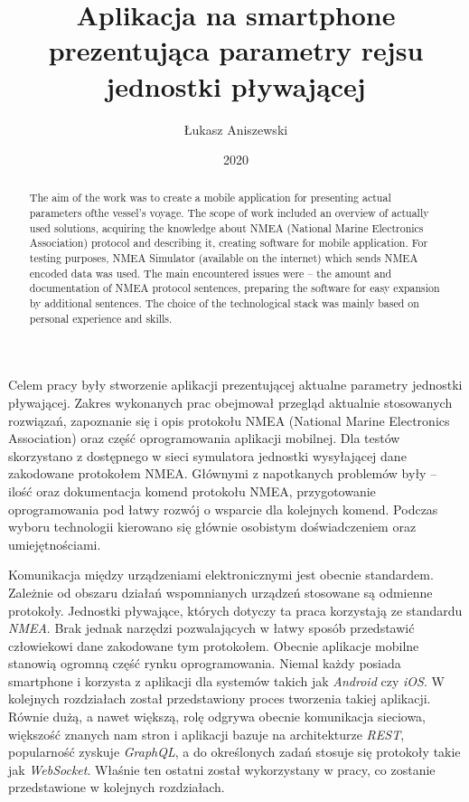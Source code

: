 \documentclass[skorowidz,skroty]{dyplomWEZUT}
\author{Łukasz Aniszewski}
\title{Aplikacja na smartphone prezentująca parametry rejsu jednostki pływającej}
\date{2020}
\begin{document}
\begin{streszczenie}
Celem pracy były stworzenie aplikacji prezentującej aktualne parametry jednostki pływającej. Zakres wykonanych prac obejmował przegląd aktualnie stosowanych rozwiązań, zapoznanie się i opis protokołu NMEA (National Marine Electronics Association) oraz część oprogramowania aplikacji mobilnej. Dla testów skorzystano z dostępnego w sieci symulatora jednostki wysyłającej dane zakodowane protokołem NMEA. Głównymi z napotkanych problemów były – ilość oraz dokumentacja komend protokołu NMEA, przygotowanie oprogramowania pod łatwy rozwój o wsparcie dla kolejnych komend. Podczas wyboru technologii kierowano się głównie osobistym doświadczeniem oraz umiejętnościami. 
\end{streszczenie}

\begin{abstract}
The aim of the work was to create a mobile application for presenting actual parameters ofthe vessel's voyage. The scope of work included an overview of actually used solutions, acquiring the knowledge about NMEA (National Marine Electronics Association) protocol and describing it, creating software for mobile application. For testing purposes, NMEA Simulator (available on the internet) which sends NMEA encoded data was used. The main encountered issues were – the amount and documentation of NMEA protocol sentences, preparing the software for easy expansion by additional sentences. The choice of the technological stack was mainly based on personal experience and skills.
\end{abstract}

\maketitle

\begin{wprowadzenie}

Komunikacja między urządzeniami elektronicznymi jest obecnie standardem. Zależnie od obszaru działań wspomnianych urządzeń stosowane są odmienne protokoły. Jednostki pływające, których dotyczy ta praca korzystają ze standardu \textit{NMEA}. Brak jednak narzędzi pozwalających w łatwy sposób przedstawić człowiekowi dane zakodowane tym protokołem. Obecnie aplikacje mobilne stanowią ogromną część rynku oprogramowania. Niemal każdy posiada smartphone i korzysta z aplikacji dla systemów takich jak \textit{Android} czy \textit{iOS}. W kolejnych rozdziałach został przedstawiony proces tworzenia takiej aplikacji. Równie dużą, a nawet większą, rolę odgrywa obecnie komunikacja sieciowa, większość znanych nam stron i aplikacji bazuje na architekturze \textit{REST}, popularność zyskuje \textit{GraphQL}, a do określonych zadań stosuje się protokoły takie jak \textit{WebSocket}. Właśnie ten ostatni został wykorzystany w pracy, co zostanie przedstawione w kolejnych rozdziałach. 

\end{wprowadzenie}
\end{document}
